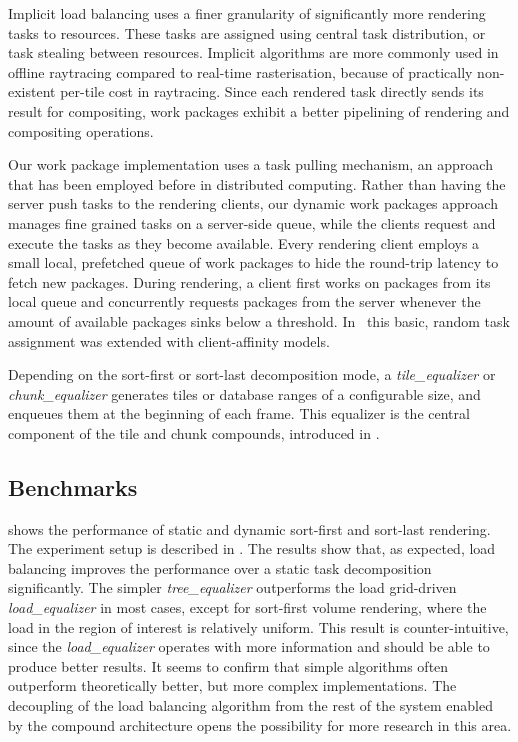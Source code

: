 Implicit load balancing uses a finer granularity of significantly more rendering tasks
to resources. These tasks are assigned using central task distribution, or
 task stealing between resources. Implicit algorithms are more
commonly used in offline raytracing compared to real-time rasterisation,
 because of practically non-existent per-tile cost in raytracing.
Since each rendered task directly sends its result for
compositing, work packages exhibit a better pipelining of rendering and
compositing operations.

Our work package implementation uses a task pulling mechanism, an approach that
has been employed before in distributed computing. Rather than having the
server push tasks to the rendering clients, our dynamic work packages approach
manages fine grained tasks on a server-side queue, while the clients
request and execute the tasks as they become available. Every rendering client
employs a small local, prefetched queue of work packages to hide the round-trip
latency to fetch new packages. During rendering, a client first works on
packages from its local queue and concurrently requests packages from the
server whenever the amount of available packages sinks below a threshold.
In~\cite{SPEP:16} this basic, random task assignment was extended with
client-affinity models.

Depending on the sort-first or sort-last decomposition mode, a {\em
tile\_equalizer} or {\em chunk\_equalizer} generates tiles or database ranges
of a configurable size, and enqueues them at the beginning of each frame. This
equalizer is the central component of the tile and chunk compounds, introduced
in .


\subsection{Benchmarks}

 shows the performance of static and dynamic sort-first
and sort-last rendering. The experiment setup is described in \cite{ESP:18}.
The results show that, as expected, load balancing improves the performance
over a static task decomposition significantly. The simpler
{\em tree\_equalizer} outperforms the load grid-driven
{\em load\_equalizer} in most cases, except for sort-first volume rendering,
where the load in the region of interest is relatively uniform. This result is
counter-intuitive, since the {\em load\_equalizer} operates with more
information and should be able to produce better results. It seems to confirm
that simple algorithms often outperform theoretically better, but more complex
implementations. The decoupling of the load balancing algorithm from the rest
of the system enabled by the compound architecture opens the possibility for
more research in this area.

